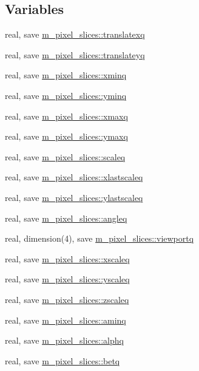 \subsection*{Variables}
\begin{DoxyCompactItemize}
\item 
real, save \mbox{\hyperlink{namespacem__pixel__slices_a984b384660455b08f81e6ba889c4f181}{m\+\_\+pixel\+\_\+slices\+::translatexq}}
\item 
real, save \mbox{\hyperlink{namespacem__pixel__slices_ac0ed11bf15d4d4bf8a97194d64035b02}{m\+\_\+pixel\+\_\+slices\+::translateyq}}
\item 
real, save \mbox{\hyperlink{namespacem__pixel__slices_a982eea046c0a07e9767fac51b96e9c5b}{m\+\_\+pixel\+\_\+slices\+::xminq}}
\item 
real, save \mbox{\hyperlink{namespacem__pixel__slices_afc89e60a080837a7d23abc70409bcde7}{m\+\_\+pixel\+\_\+slices\+::yminq}}
\item 
real, save \mbox{\hyperlink{namespacem__pixel__slices_a72480fe0bf407c578fb6c6c01b929447}{m\+\_\+pixel\+\_\+slices\+::xmaxq}}
\item 
real, save \mbox{\hyperlink{namespacem__pixel__slices_a9f789eabf3f49da6fdd6c713642836c5}{m\+\_\+pixel\+\_\+slices\+::ymaxq}}
\item 
real, save \mbox{\hyperlink{namespacem__pixel__slices_a560f9a31fb656d89f985a6bb0c00d815}{m\+\_\+pixel\+\_\+slices\+::scaleq}}
\item 
real, save \mbox{\hyperlink{namespacem__pixel__slices_ae99e40f4f0b19ff8415ac84db8532f0d}{m\+\_\+pixel\+\_\+slices\+::xlastscaleq}}
\item 
real, save \mbox{\hyperlink{namespacem__pixel__slices_a15c58d927d442047ca7d648b32b0971a}{m\+\_\+pixel\+\_\+slices\+::ylastscaleq}}
\item 
real, save \mbox{\hyperlink{namespacem__pixel__slices_ad82933d6a03faeb06a790664ed1e4cb7}{m\+\_\+pixel\+\_\+slices\+::angleq}}
\item 
real, dimension(4), save \mbox{\hyperlink{namespacem__pixel__slices_a46f6b80eeb99ecff5fd18e41d1b17f0a}{m\+\_\+pixel\+\_\+slices\+::viewportq}}
\item 
real, save \mbox{\hyperlink{namespacem__pixel__slices_aea975665739d351db83cfcc41e1914db}{m\+\_\+pixel\+\_\+slices\+::xscaleq}}
\item 
real, save \mbox{\hyperlink{namespacem__pixel__slices_aff993c23736cb8fc57b8b3ebe5021ba5}{m\+\_\+pixel\+\_\+slices\+::yscaleq}}
\item 
real, save \mbox{\hyperlink{namespacem__pixel__slices_af1ea5e682e81c2984c650485935a93e8}{m\+\_\+pixel\+\_\+slices\+::zscaleq}}
\item 
real, save \mbox{\hyperlink{namespacem__pixel__slices_ae256fff4bec0279eb4e2439eb3973a1f}{m\+\_\+pixel\+\_\+slices\+::aminq}}
\item 
real, save \mbox{\hyperlink{namespacem__pixel__slices_a72bdfc50e6b4b5a8b123083e4e529e9c}{m\+\_\+pixel\+\_\+slices\+::alphq}}
\item 
real, save \mbox{\hyperlink{namespacem__pixel__slices_ab90a7c0b6645a0405a9c5e9feff7b153}{m\+\_\+pixel\+\_\+slices\+::betq}}
\end{DoxyCompactItemize}
